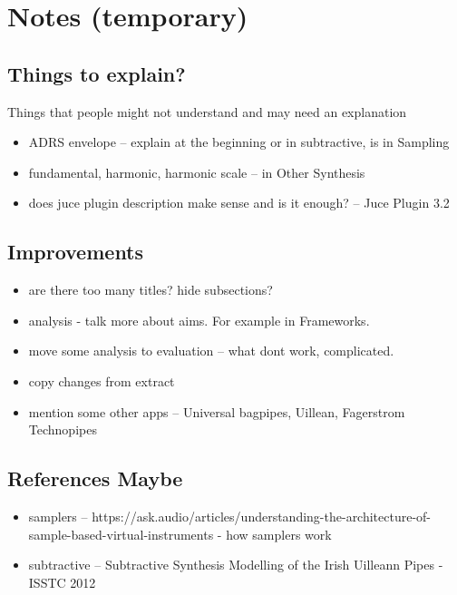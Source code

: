 \documentclass[12pt]{article}
\begin{document}
\section{Notes (temporary)}
	\subsection{Things to explain? }
	Things that people might not understand and may need an explanation
	\begin{itemize}
		\item ADRS envelope -- explain at the beginning or in subtractive, is in Sampling
		\item fundamental, harmonic, harmonic scale -- in Other Synthesis
		\item does juce plugin description make sense and is it enough? -- Juce Plugin 3.2
	\end{itemize}

	\subsection{Improvements}
	\begin{itemize}
		\item are there too many titles? hide subsections?
		\item analysis - talk more about aims. For example in Frameworks.
		\item move some analysis to evaluation -- what dont work, complicated.
		\item copy changes from extract
		\item mention some other apps -- Universal bagpipes, Uillean, Fagerstrom Technopipes
	\end{itemize}

	\subsection{References Maybe}
	\begin{itemize}
		\item samplers -- https://ask.audio/articles/understanding-the-architecture-of-sample-based-virtual-instruments - how samplers work
		\item subtractive -- Subtractive Synthesis Modelling of the Irish Uilleann Pipes - ISSTC 2012
	\end{itemize}
	



	
\end{document}
